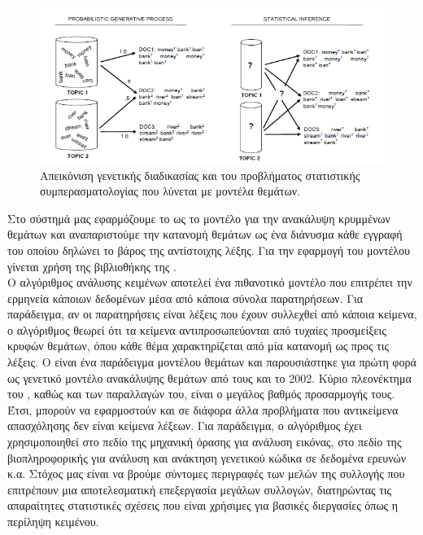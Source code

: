 {{{{{{{{\begin{figure}[!ht] \centering
\centerline{
    \includegraphics[scale=0.75]{static/figures/model.png}}
    \caption{Απεικόνιση γενετικής διαδικασίας και του προβλήματος στατιστικής συμπερασματολογίας 
    που λύνεται με μοντέλα θεμάτων.}
    \label{fig:ldamodel01}
\end{figure}

Στο σύστημά μας εφαρμόζουμε το \textbf{{}} ως το μοντέλο για την ανακάλυψη κρυμμένων θεμάτων 
και αναπαριστούμε την κατανομή θεμάτων ως ένα διάνυσμα κάθε εγγραφή του οποίου δηλώνει το βάρος της αντίστοιχης λέξης. 
Για την εφαρμογή του {} μοντέλου γίνεται χρήση της βιβλιοθήκης {} \cite{Lda01} της {}. \\

Ο αλγόριθμος ανάλυσης κειμένων {} αποτελεί ένα πιθανοτικό μοντέλο που επιτρέπει την
ερμηνεία κάποιων δεδομένων μέσα από κάποια σύνολα παρατηρήσεων. 
Για παράδειγμα, αν οι παρατηρήσεις είναι λέξεις που έχουν συλλεχθεί από κάποια κείμενα, 
ο αλγόριθμος θεωρεί ότι τα κείμενα αντιπροσωπεύονται από τυχαίες προσμείξεις
κρυφών θεμάτων, όπου κάθε θέμα χαρακτηρίζεται από μία κατανομή ως προς τις λέξεις.
Ο {} είναι ένα παράδειγμα μοντέλου θεμάτων και παρουσιάστηκε για πρώτη φορά ως γενετικό
μοντέλο ανακάλυψης θεμάτων από τους {} και {} το 2002.
Κύριο πλεονέκτημα του {}, καθώς και των παραλλαγών του, είναι ο μεγάλος βαθμός
προσαρμογής τους. Έτσι, μπορούν να εφαρμοστούν και σε διάφορα άλλα προβλήματα που
αντικείμενα απασχόλησης δεν είναι κείμενα λέξεων. Για παράδειγμα, ο αλγόριθμος έχει
χρησιμοποιηθεί στο πεδίο της μηχανική όρασης για ανάλυση εικόνας, στο πεδίο της
βιοπληροφορικής για ανάλυση και ανάκτηση γενετικού κώδικα σε δεδομένα ερευνών κ.α. 
Στόχος μας είναι να βρούμε σύντομες περιγραφές των μελών της συλλογής 
που επιτρέπουν μια αποτελεσματική επεξεργασία μεγάλων συλλογών, 
διατηρώντας τις απαραίτητες στατιστικές σχέσεις που είναι χρήσιμες
για βασικές διεργασίες όπως η περίληψη κειμένου.

}}}}}}}}
